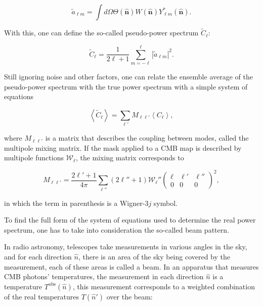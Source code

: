 \documentclass[openany,a4paper,12pt,oneside]{book}
\newcommand{\av}[1]{\left\langle #1 \right\rangle} %
\begin{document}
\begin{spacing}{1.5}
\begin{equation}\label{ch3:tilde_a}
    \tilde{a}_{\ell m}=\int d\Omega \Theta(\hat{\mathbf{n}})W(\hat{\mathbf{n}})Y_{\ell m}^* (\hat{\mathbf{n}}).
\end{equation}

With this, one can define the so-called pseudo-power spectrum $\tilde{C}_\ell$:

\begin{equation}\label{ch3:tilde_Cl}
    \tilde{C}_\ell=\frac{1}{2\ell+1}\sum_{m=-\ell}^\ell |\tilde{a}_{\ell m}|^2.
\end{equation}

Still ignoring noise and other factors, one can relate the ensemble average of the pseudo-power spectrum with the true power spectrum with a simple system of equations

\begin{equation}
    \av{\tilde{C}_\ell}=\sum_{\ell'} M_{\ell \ell'} \av{C_\ell},
\end{equation}

\noindent where $M_{\ell \ell'}$ is a matrix that describes the coupling between modes, called the multipole mixing matrix. If the mask applied to a CMB map is described by multipole functions $\mathcal{W}_\ell$, the mixing matrix corresponds to

\begin{equation}
    M_{\ell \ell'}=\frac{2\ell'+1}{4\pi}\sum_{\ell''}(2\ell''+1)\mathcal{W}_\ell''
    \begin{pmatrix}
        \ell & \ell' & \ell''\\
        0 & 0 & 0
    \end{pmatrix}^2,
\end{equation}

\noindent in which the term in parenthesis is a Wigner-$3j$ symbol.

To find the full form of the system of equations used to determine the real power spectrum, one has to take into consideration the so-called beam pattern. 

In radio astronomy, telescopes take measurements in various angles in the sky, and for each direction $\hat{n}$, there is an area of the sky being covered by the measurement, each of these areas is called a beam. In an apparatus that measures CMB photons' temperatures, the measurement in each direction $\hat{n}$ is a temperature $T^\text{obs}(\hat{n})$, this measurement corresponds to a weighted combination of the real temperatures $T(\hat{n}')$ over the beam:%


\end{spacing}
\end{document}
